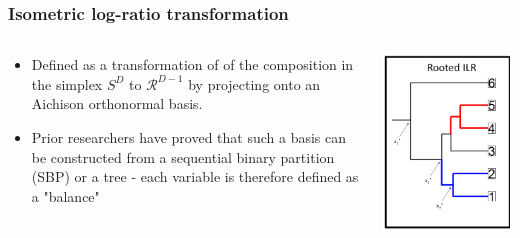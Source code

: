 \documentclass{beamer}
\begin{document}
\begin{frame}
    \frametitle{Isometric log-ratio transformation}
    \begin{columns}
        \begin{column}{0.5\textwidth}
            \begin{itemize}
                \item Defined as a transformation of of the composition in the simplex $S^D$ to $\mathcal{R}^{D-1}$ by projecting onto an Aichison orthonormal basis. 
                \item Prior researchers have proved \cite{egozcue2003} that such a basis can be constructed from a sequential binary partition (SBP) or a tree - each variable is therefore defined as a "balance" \cite{morton2017a}
            \end{itemize}
        \end{column}
        \begin{column}{0.5\textwidth}
            \begin{center}
                \includegraphics[scale=0.5]{figures/phylogeny_demonstration.png}
            \end{center}
        \end{column}
    \end{columns}
\end{frame}
\end{document}
